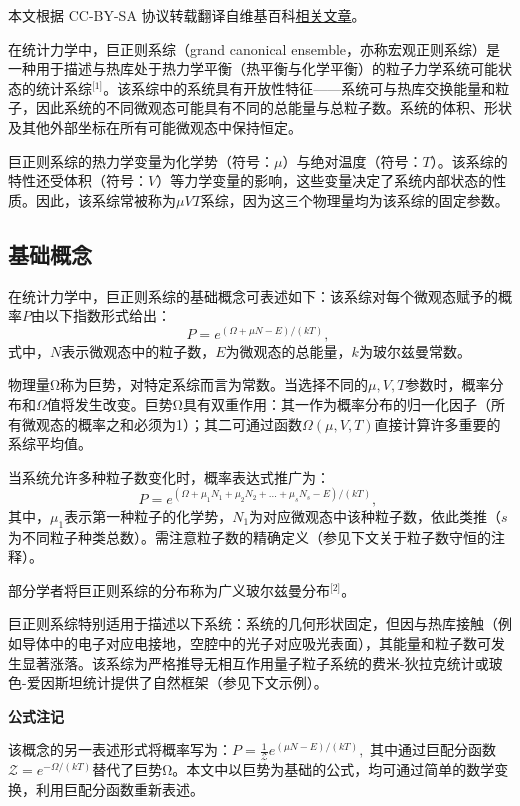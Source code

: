 
本文根据 CC-BY-SA 协议转载翻译自维基百科\href{https://en.wikipedia.org/wiki/Grand_canonical_ensemble}{相关文章}。

在统计力学中，巨正则系综（grand canonical ensemble，亦称宏观正则系综）是一种用于描述与热库处于热力学平衡（热平衡与化学平衡）的粒子力学系统可能状态的统计系综\(^\text{[1]}\)。该系综中的系统具有开放性特征——系统可与热库交换能量和粒子，因此系统的不同微观态可能具有不同的总能量与总粒子数。系统的体积、形状及其他外部坐标在所有可能微观态中保持恒定。

巨正则系综的热力学变量为化学势（符号：\(\mu\)）与绝对温度（符号：\(T\)）。该系综的特性还受体积（符号：\(V\)）等力学变量的影响，这些变量决定了系统内部状态的性质。因此，该系综常被称为\(\mu VT\)系综，因为这三个物理量均为该系综的固定参数。
\subsection{基础概念}
在统计力学中，巨正则系综的基础概念可表述如下：该系综对每个微观态赋予的概率\(P\)由以下指数形式给出：
\[
P = e^{(\Omega + \mu N - E)/(kT)},~
\]
式中，\(N\)表示微观态中的粒子数，\(E\)为微观态的总能量，\(k\)为玻尔兹曼常数。  

物理量Ω称为巨势，对特定系综而言为常数。当选择不同的\(\mu,V,T\)参数时，概率分布和\(\Omega\)值将发生改变。巨势Ω具有双重作用：其一作为概率分布的归一化因子（所有微观态的概率之和必须为1）；其二可通过函数\(\Omega(\mu,V,T)\)直接计算许多重要的系综平均值。  

当系统允许多种粒子数变化时，概率表达式推广为：  
\[
P = e^{(\Omega + \mu_1N_1 + \mu_2N_2 + \ldots + \mu_sN_s - E)/(kT)},~
\]  
其中，\(\mu_1\)表示第一种粒子的化学势，\(N_1\)为对应微观态中该种粒子数，依此类推（\(s\)为不同粒子种类总数）。需注意粒子数的精确定义（参见下文关于粒子数守恒的注释）。  

部分学者将巨正则系综的分布称为广义玻尔兹曼分布\(^\text{[2]}\)。

巨正则系综特别适用于描述以下系统：系统的几何形状固定，但因与热库接触（例如导体中的电子对应电接地，空腔中的光子对应吸光表面），其能量和粒子数可发生显著涨落。该系综为严格推导无相互作用量子粒子系统的费米-狄拉克统计或玻色-爱因斯坦统计提供了自然框架（参见下文示例）。 

\textbf{公式注记} 

该概念的另一表述形式将概率写为：\(P = \frac{1}{\mathcal{Z}} e^{(\mu N - E)/(kT)},\)  
其中通过巨配分函数\(\mathcal{Z} = e^{-\Omega/(kT)}\)替代了巨势Ω。本文中以巨势为基础的公式，均可通过简单的数学变换，利用巨配分函数重新表述。  
